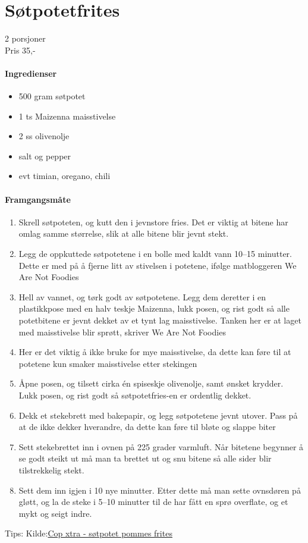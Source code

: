 \section{Søtpotetfrites}
\label{frites}

2 porsjoner\\
Pris 35,-

\paragraph{Ingredienser}
\begin{itemize}[noitemsep]
	\item 500 gram søtpotet
	\item 1 ts Maizenna maisstivelse
	\item 2 ss olivenolje
	\item salt og pepper
	\item evt timian, oregano, chili
\end{itemize}

\paragraph{Framgangsmåte}
\begin{enumerate}[noitemsep]
	\item Skrell søtpoteten, og kutt den i jevnstore fries. Det er viktig at bitene har omlag samme størrelse, slik at alle bitene blir jevnt stekt.
	\item Legg de oppkuttede søtpotetene i en bolle med kaldt vann 10--15 minutter. Dette er med på å fjerne litt av stivelsen i potetene, ifølge matbloggeren We Are Not Foodies
	\item Hell av vannet, og tørk godt av søtpotetene. Legg dem deretter i en plastikkpose med en halv teskje Maizenna, lukk posen, og rist godt så alle potetbitene er jevnt dekket av et tynt lag maisstivelse. Tanken her er at laget med maisstivelse blir sprøtt, skriver We Are Not Foodies
	\item Her er det viktig å ikke bruke for mye maisstivelse, da dette kan føre til at potetene kun smaker maisstivelse etter stekingen
	\item Åpne posen, og tilsett cirka én spiseskje olivenolje, samt ønsket krydder. Lukk posen, og rist godt så søtpotetfries-en er ordentlig dekket.
	\item Dekk et stekebrett med bakepapir, og legg søtpotetene jevnt utover. Pass på at de ikke dekker hverandre, da dette kan føre til bløte og slappe biter
	\item Sett stekebrettet inn i ovnen på 225 grader varmluft. Når bitetene begynner å se godt steikt ut må man ta brettet ut og snu bitene så alle sider blir tilstrekkelig stekt.
	\item Sett dem inn igjen i 10 nye minutter. Etter dette må man sette ovnsdøren på gløtt, og la de steke i 5--10 minutter til de har fått en sprø overflate, og et mykt og seigt indre.

\end{enumerate}

Tips:
Kilde:\href{https://coop.no/extra/mat--trender/garantert-spro-sotpotetfries/}{Cop xtra - søtpotet pommes frites}
